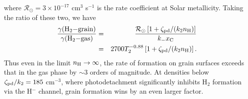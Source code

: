 \begin{enumerate}
\begin{enumerate}
where $\mathcal{R}_{\odot} = 3\times 10^{-17}$ cm$^3$ s$^{-1}$ is the rate coefficient at Solar metallicity. Taking the ratio of these two, we have
\begin{eqnarray*}
\frac{\gamma({\rm H}_2{\rm - grain})}{\gamma({\rm H}_2{\rm - gas})} & = & \frac{\mathcal{R}_{\odot} \left[1+ \zeta_{\rm pd}/(k_2 n_{\rm H})\right]}{k_{-} x_{\rm C}} \\
& = & 2700 T_2^{-0.88} \left[1+ \zeta_{\rm pd}/(k_2 n_{\rm H})\right].
\end{eqnarray*}
Thus even in the limit $n_{\rm H} \rightarrow \infty$, the rate of formation on grain surfaces exceeds that in the gas phase by $\sim 3$ orders of magnitude. At densities below $\zeta_{\rm pd}/k_2 = 185$ cm$^{-3}$, where photodetachment significantly inhibits H$_2$ formation via the H$^-$ channel, grain formation wins by an even larger factor.\\


\end{enumerate}
\end{enumerate}
